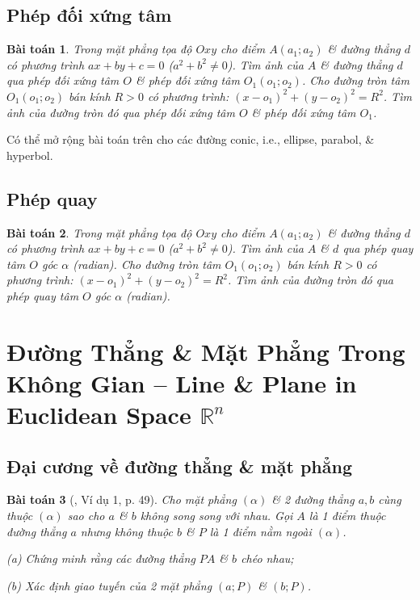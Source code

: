 \documentclass{article}
\numberwithin{equation}{section}
\newtheorem{baitoan}{Bài toán}[section]
\begin{document}

\subsection{Phép đối xứng tâm}

\begin{baitoan}
	Trong mặt phẳng tọa độ $Oxy$ cho điểm $A(a_1;a_2)$ \& đường thẳng $d$ có phương trình $ax + by + c = 0$ ($a^2 + b^2\ne 0$). Tìm ảnh của $A$ \& đường thẳng $d$ qua phép đối xứng tâm $O$ \& phép đối xứng tâm $O_1(o_1;o_2)$. Cho đường tròn tâm $O_1(o_1;o_2)$ bán kính $R > 0$ có phương trình: $(x - o_1)^2 + (y - o_2)^2 = R^2$. Tìm ảnh của đường tròn đó qua phép đối xứng tâm $O$ \& phép đối xứng tâm $O_1$.
\end{baitoan}
Có thể mở rộng bài toán trên cho các đường conic, i.e., ellipse, parabol, \& hyperbol.


\subsection{Phép quay}

\begin{baitoan}
	Trong mặt phẳng tọa độ $Oxy$ cho điểm $A(a_1;a_2)$ \& đường thẳng $d$ có phương trình $ax + by + c = 0$ ($a^2 + b^2\ne 0$). Tìm ảnh của $A$ \& $d$ qua phép quay tâm $O$ góc $\alpha$ (radian). Cho đường tròn tâm $O_1(o_1;o_2)$ bán kính $R > 0$ có phương trình: $(x - o_1)^2 + (y - o_2)^2 = R^2$. Tìm ảnh của đường tròn đó qua phép quay tâm $O$ góc $\alpha$ (radian).
\end{baitoan}



\section{Đường Thẳng \& Mặt Phẳng Trong Không Gian -- Line \& Plane in Euclidean Space $\mathbb{R}^n$}

\subsection{Đại cương về đường thẳng \& mặt phẳng}

\begin{baitoan}[\cite{TL_chuyen_Toan_Hinh_Hoc_11}, Ví dụ 1, p. 49]
	Cho mặt phẳng $(\alpha)$ \& 2 đường thẳng $a,b$ cùng thuộc $(\alpha)$ sao cho $a$ \& $b$ không song song với nhau. Gọi $A$ là 1 điểm thuộc đường thẳng $a$ nhưng không thuộc $b$ \& $P$ là 1 điểm nằm ngoài $(\alpha)$.
	\begin{enumerate*}
		\item[(a)] Chứng minh rằng các đường thẳng $PA$ \& $b$ chéo nhau;
		\item[(b)] Xác định giao tuyến của 2 mặt phẳng $(a;P)$ \& $(b;P)$.
	\end{enumerate*}
\end{baitoan}
\end{document}
